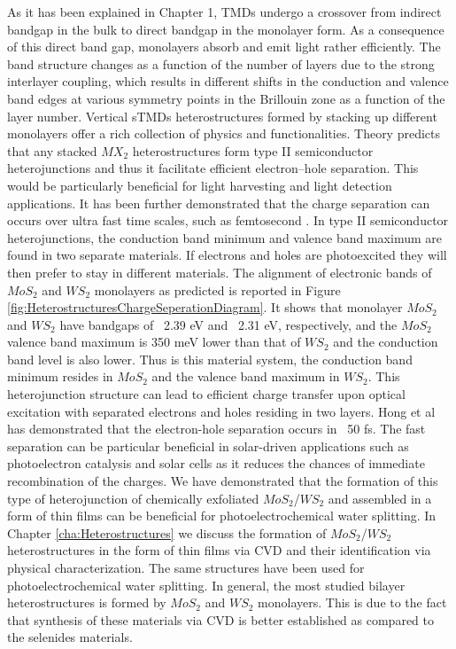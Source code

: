 As it has been explained in Chapter 1, TMDs undergo a crossover from indirect bandgap in the bulk to direct bandgap in the monolayer form. As a consequence of this direct band gap, monolayers absorb and emit light rather efficiently. The band structure changes as a function of the number of layers due to the strong interlayer coupling, which results in different shifts in the conduction and valence band edges at various symmetry points in the Brillouin zone as a function of the layer number.  Vertical sTMDs heterostructures formed by stacking up different monolayers offer a rich collection of physics and functionalities. Theory predicts that any stacked $MX_2$ heterostructures form type II semiconductor heterojunctions and thus it facilitate efficient electron–hole separation. This would be particularly beneficial for light harvesting and light detection applications. It has been further demonstrated that the charge separation can occurs over ultra fast time scales, such as femtosecond \cite{Hong2014}.
In type II semiconductor heterojunctions, the conduction band minimum and valence band maximum are found in two separate materials. If electrons and holes are photoexcited they will then prefer to stay in different materials. The alignment of electronic bands of $MoS_2$ and $WS_2$ monolayers as predicted \cite{Gong2013} is reported in Figure \ref{fig:HeterostructuresChargeSeperationDiagram}. It shows that monolayer $MoS_2$ and $WS_2$ have bandgaps of ~2.39 eV and ~2.31 eV, respectively, and the $MoS_2$ valence band maximum is 350 meV lower than that of $WS_2$ and the conduction band level is also lower. Thus is this material system, the conduction band minimum resides in $MoS_2$ and the valence band maximum in $WS_2$. This heterojunction structure can lead to efficient charge transfer upon optical excitation with separated electrons and holes residing in two layers. Hong et al has demonstrated that the electron-hole separation occurs in ~50 fs. The fast separation can be particular beneficial in solar-driven applications such as photoelectron catalysis and solar cells as it reduces the chances of immediate recombination of the charges.
We have demonstrated that the formation of this type of heterojunction of chemically exfoliated $MoS_2$/$WS_2$ and assembled in a form of thin films can be beneficial for photoelectrochemical water splitting. In Chapter \ref{cha:Heterostructures} we discuss the formation of $MoS_2$/$WS_2$ heterostructures in the form of thin films via CVD and their identification via physical characterization. The same structures have been used for photoelectrochemical water splitting. In general, the most studied bilayer heterostructures is formed by $MoS_2$ and $WS_2$ monolayers. This is due to the fact that synthesis of these materials via CVD is better established as compared to the selenides materials. 

